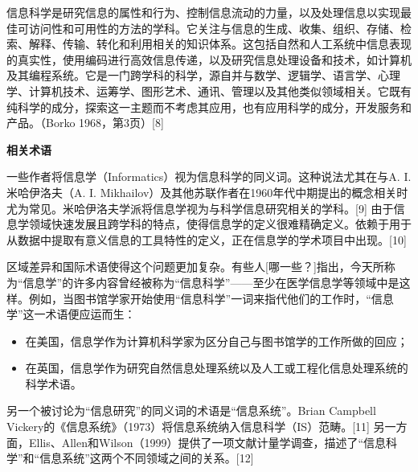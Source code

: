 信息科学是研究信息的属性和行为、控制信息流动的力量，以及处理信息以实现最佳可访问性和可用性的方法的学科。它关注与信息的生成、收集、组织、存储、检索、解释、传输、转化和利用相关的知识体系。这包括自然和人工系统中信息表现的真实性，使用编码进行高效信息传递，以及研究信息处理设备和技术，如计算机及其编程系统。它是一门跨学科的科学，源自并与数学、逻辑学、语言学、心理学、计算机技术、运筹学、图形艺术、通讯、管理以及其他类似领域相关。它既有纯科学的成分，探索这一主题而不考虑其应用，也有应用科学的成分，开发服务和产品。（Borko 1968，第3页）[8]

\textbf{相关术语}

一些作者将信息学（Informatics）视为信息科学的同义词。这种说法尤其在与A. I. 米哈伊洛夫（A. I. Mikhailov）及其他苏联作者在1960年代中期提出的概念相关时尤为常见。米哈伊洛夫学派将信息学视为与科学信息研究相关的学科。[9] 由于信息学领域快速发展且跨学科的特点，使得信息学的定义很难精确定义。依赖于用于从数据中提取有意义信息的工具特性的定义，正在信息学的学术项目中出现。[10]

区域差异和国际术语使得这个问题更加复杂。有些人[哪一些？]指出，今天所称为“信息学”的许多内容曾经被称为“信息科学”——至少在医学信息学等领域中是这样。例如，当图书馆学家开始使用“信息科学”一词来指代他们的工作时，“信息学”这一术语便应运而生：
\begin{itemize}
\item 在美国，信息学作为计算机科学家为区分自己与图书馆学的工作所做的回应；
\item 在英国，信息学作为研究自然信息处理系统以及人工或工程化信息处理系统的科学术语。
\end{itemize}
另一个被讨论为“信息研究”的同义词的术语是“信息系统”。Brian Campbell Vickery的《信息系统》（1973）将信息系统纳入信息科学（IS）范畴。[11] 另一方面，Ellis、Allen和Wilson（1999）提供了一项文献计量学调查，描述了“信息科学”和“信息系统”这两个不同领域之间的关系。[12]